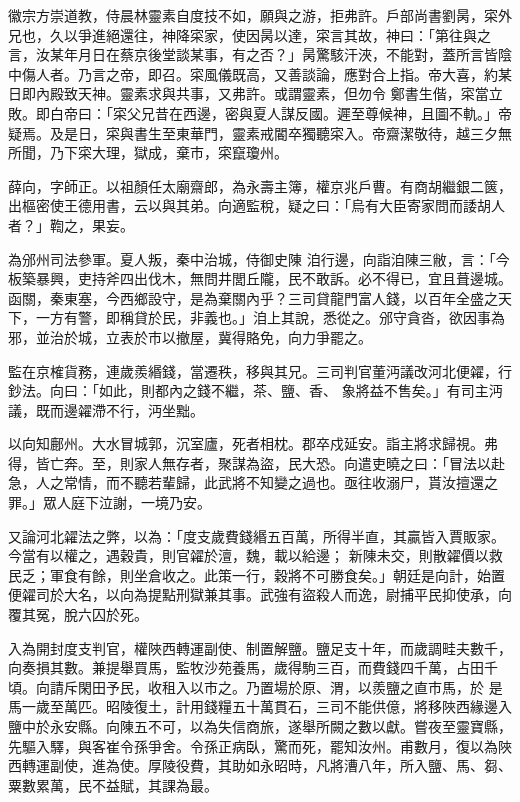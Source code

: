 \begin{pinyinscope}
 徽宗方崇道教，侍晨林靈素自度技不如，願與之游，拒弗許。戶部尚書劉昺，寀外兄也，久以爭進絕還往，神降寀家，使因昺以達，寀言其故，神曰：「第往與之言，汝某年月日在蔡京後堂談某事，有之否？」昺驚駭汗浹，不能對，蓋所言皆陰中傷人者。乃言之帝，即召。寀風儀既高，又善談論，應對合上指。帝大喜，約某日即內殿致天神。靈素求與共事，又弗許。或謂靈素，但勿令
 鄭書生偕，寀當立敗。即白帝曰：「寀父兄昔在西邊，密與夏人謀反國。遲至尊候神，且圖不軌。」帝疑焉。及是日，寀與書生至東華門，靈素戒閽卒獨聽寀入。帝齋潔敬待，越三夕無所聞，乃下寀大理，獄成，棄市，寀竄瓊州。



 薛向，字師正。以祖顏任太廟齋郎，為永壽主簿，權京兆戶曹。有商胡繼銀二篋，出樞密使王德用書，云以與其弟。向適監稅，疑之曰：「烏有大臣寄家問而諉胡人者？」鞫之，果妄。



 為邠州司法參軍。夏人叛，秦中治城，侍御史陳
 洎行邊，向詣洎陳三敝，言：「今板築暴興，吏持斧四出伐木，無問井閭丘隴，民不敢訴。必不得已，宜且葺邊城。函關，秦東塞，今西鄉設守，是為棄關內乎？三司貸龍門富人錢，以百年全盛之天下，一方有警，即稱貸於民，非義也。」洎上其說，悉從之。邠守貪沓，欲因事為邪，並治於城，立表於市以撤屋，冀得賂免，向力爭罷之。



 監在京榷貨務，連歲羨緡錢，當遷秩，移與其兄。三司判官董沔議改河北便糴，行鈔法。向曰：「如此，則都內之錢不繼，茶、鹽、香、
 象將益不售矣。」有司主沔議，既而邊糴滯不行，沔坐黜。



 以向知鄜州。大水冒城郭，沉室廬，死者相枕。郡卒戍延安。詣主將求歸視。弗得，皆亡奔。至，則家人無存者，聚謀為盜，民大恐。向遣吏曉之曰：「冒法以赴急，人之常情，而不聽若輩歸，此武將不知變之過也。亟往收溺尸，貰汝擅還之罪。」眾人庭下泣謝，一境乃安。



 又論河北糴法之弊，以為：「度支歲費錢緡五百萬，所得半直，其贏皆入賈販家。今當有以權之，遇穀貴，則官糴於澶，魏，載以給邊；
 新陳未交，則散糴價以救民乏；軍食有餘，則坐倉收之。此策一行，穀將不可勝食矣。」朝廷是向計，始置便糴司於大名，以向為提點刑獄兼其事。武強有盜殺人而逸，尉捕平民抑使承，向覆其冤，脫六囚於死。



 入為開封度支判官，權陜西轉運副使、制置解鹽。鹽足支十年，而歲調畦夫數千，向奏損其數。兼提舉買馬，監牧沙苑養馬，歲得駒三百，而費錢四千萬，占田千頃。向請斥閑田予民，收租入以市之。乃置場於原、渭，以羨鹽之直市馬，於
 是馬一歲至萬匹。昭陵復土，計用錢糧五十萬貫石，三司不能供億，將移陜西緣邊入鹽中於永安縣。向陳五不可，以為失信商旅，遂舉所闕之數以獻。嘗夜至靈寶縣，先驅入驛，與客崔令孫爭舍。令孫正病臥，驚而死，罷知汝州。甫數月，復以為陜西轉運副使，進為使。厚陵役費，其助如永昭時，凡將漕八年，所入鹽、馬、芻、粟數累萬，民不益賦，其課為最。




\end{pinyinscope}
